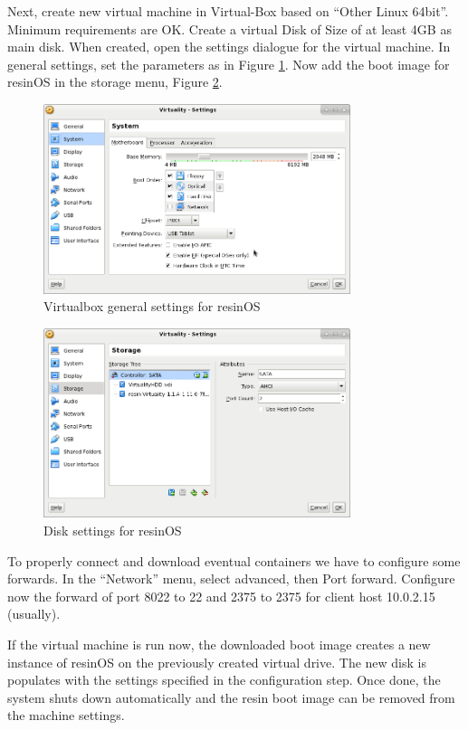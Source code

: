 \documentclass[]{scrartcl}
\begin{document}
Next, create new virtual machine in Virtual-Box based on ``Other Linux 64bit''. Minimum requirements are OK. Create a virtual Disk of Size of at least 4GB as main disk. 
When created, open the settings dialogue for the virtual machine. In general settings, set the parameters as in Figure \ref{fig:resingen}. Now add the boot image for resinOS in the storage menu, Figure \ref{fig:resindisk}.

\begin{figure}[t]
	\centering
	\includegraphics[width=0.8\textwidth]{resin-vbox}
	\caption{Virtualbox general settings for resinOS}
	\label{fig:resingen}
\end{figure}

\begin{figure}[t]
	\centering
	\includegraphics[width=0.8\textwidth]{resin-vbox2}
	\caption{Disk settings for resinOS}
	\label{fig:resindisk}
\end{figure}

To properly connect and download eventual containers we have to configure some forwards. In the ``Network'' menu, select advanced, then Port forward. Configure now the forward of port 8022 to 22  and 2375 to 2375 for client host 10.0.2.15 (usually).

If the virtual machine is run now, the downloaded boot image creates a new instance of resinOS on the previously created virtual drive. The new disk is populates with the settings specified in the configuration step. Once done, the system shuts down automatically and the resin boot image can be removed from the machine settings.
\end{document}

